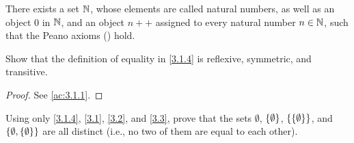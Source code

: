 \begin{ax}[Infinity]\label{3.7}
	There exists a set \(\mathbb{N}\), whose elements are called natural numbers, as well as an object \(0\) in \(\mathbb{N}\), and an object \(n++\) assigned to every natural number \(n \in \mathbb{N}\), such that the Peano axioms () hold.
\end{ax}

\exercisesection

\begin{ex}\label{ex:3.1.1}
	Show that the definition of equality in \cref{3.1.4} is reflexive, symmetric, and transitive.
\end{ex}

\begin{proof}
	See \cref{ac:3.1.1}.
\end{proof}

\begin{ex}\label{ex:3.1.2}
	Using only \cref{3.1.4}, \cref{3.1}, \cref{3.2}, and \cref{3.3}, prove that the sets \(\emptyset\), \(\left\lbrace\emptyset\right\rbrace\), \(\left\lbrace\left\lbrace\emptyset\right\rbrace\right\rbrace\), and \(\left\lbrace\emptyset, \left\lbrace\emptyset\right\rbrace\right\rbrace\) are all distinct
	(i.e., no two of them are equal to each other).
\end{ex}

